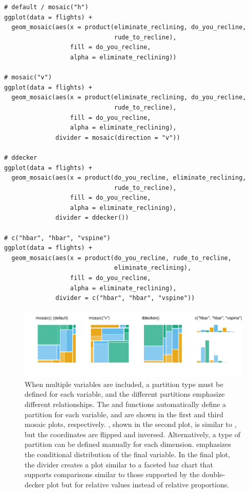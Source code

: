 \begin{verbatim}
# default / mosaic("h")
ggplot(data = flights) +
  geom_mosaic(aes(x = product(eliminate_reclining, do_you_recline,
                              rude_to_recline), 
                  fill = do_you_recline, 
                  alpha = eliminate_reclining))

# mosaic("v")
ggplot(data = flights) +
  geom_mosaic(aes(x = product(eliminate_reclining, do_you_recline,
                              rude_to_recline), 
                  fill = do_you_recline, 
                  alpha = eliminate_reclining),
              divider = mosaic(direction = "v"))

# ddecker
ggplot(data = flights) + 
  geom_mosaic(aes(x = product(do_you_recline, eliminate_reclining,
                              rude_to_recline), 
                  fill = do_you_recline, 
                  alpha = eliminate_reclining),
              divider = ddecker()) 

# c("hbar", "hbar", "vspine")
ggplot(data = flights) + 
  geom_mosaic(aes(x = product(do_you_recline, rude_to_recline,
                              eliminate_reclining), 
                  fill = do_you_recline, 
                  alpha = eliminate_reclining),
              divider = c("hbar", "hbar", "vspine"))
\end{verbatim}

\begin{figure}

{\centering \includegraphics[width=1\linewidth]{RJ-2023-013_files/figure-latex/part3-1} 

}

\caption{When multiple variables are included, a partition type must be defined for each variable, and the different partitions emphasize different relationships. The  and  functions automatically define a partition for each variable, and are shown in the first and third mosaic plots, respectively. , shown in the second plot, is similar to , but the coordinates are flipped and inversed. Alternatively, a type of partition can be defined manually for each dimension.  emphasizes the conditional distribution of the final variable. In the final plot, the divider  creates a plot similar to a faceted bar chart that supports comparisons similar to those supported by the double-decker plot but for relative values instead of relative proportions.}\label{fig:part3}
\end{figure}

